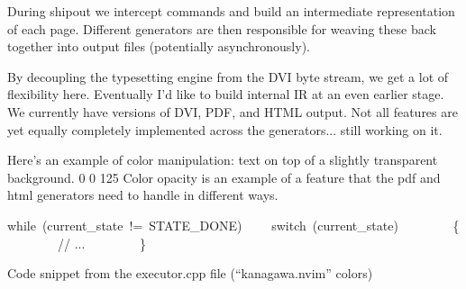 
\resettimer

\setaspectratioXVIbyIX


    \beginrow
        \begincol
            \vskip 20pt
            During shipout we intercept commands and build an intermediate representation of each page. Different generators are then responsible for weaving these back together into output files (potentially asynchronously).
    \pause

            By decoupling the typesetting engine from the DVI byte stream, we get a lot of flexibility here. Eventually I'd like to build internal IR at an even earlier stage.
        \endcol
        \pause
        \begincol
            \vskip 20pt
            We currently have versions of DVI, PDF, and HTML output.
            \vskip 20pt
            Not all features are yet equally completely implemented across the generators... still working on it.
        \endcol
    \endrow

    \pause
    \vskip 15pt
    {\bodyfonti
    Here's an example of color manipulation: text on top of a slightly transparent background.  0 0 125 Color opacity \popcolor is an example of a feature that the pdf and html generators need to handle in different ways.
    }
    \pause
    \vskip 30pt

    \begincodeblock
    {
    \kanagawaViolet while\ \popcolor \kanagawaParen (\popcolor{}\kanagawaWhite current\_state\ \popcolor \kanagawaOp !=\ \popcolor \kanagawaOrange STATE\_DONE\popcolor\kanagawaParen )\popcolor
    \vskip 3pt
    \ \ \ \ \kanagawaViolet switch\ \popcolor\kanagawaParen(\popcolor{}\kanagawaWhite current\_state\popcolor\kanagawaParen )
    \vskip 3pt
    \ \ \ \ \ \ \ \ \{
    \vskip 3pt
    \ \ \ \ \ \ \ \ \kanagawaComment // ...\popcolor
    \vskip 3pt
    \ \ \ \ \ \ \ \ \}
    }
    \popcolor
    \endcodeblock

    \centerline{Code snippet from the {\bodycode executor.cpp} file {\bodyfont(``kanagawa.nvim'' colors)}}
\endslide

